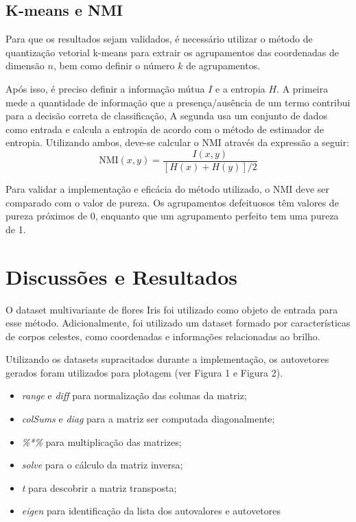 \documentclass{article}
\begin{document}
        \subsection{K-means e NMI}

            Para que os resultados sejam validados, é necessário utilizar o método de quantização vetorial k-means para extrair os agrupamentos das coordenadas de dimensão $n$, bem como definir o número $k$ de agrupamentos.

            Após isso, é preciso definir a informação mútua $I$ e a entropia $H$.
            A primeira mede a quantidade de informação que a presença/ausência de um termo contribui para a decisão correta de classificação,
            A segunda usa um conjunto de dados como entrada e calcula a entropia de acordo com o método de estimador de entropia.
            Utilizando ambos, deve-se calcular o NMI através da expressão a seguir:
            \[
                \text{NMI}(x,y)=\frac{I(x,y)}{[H(x)+H(y)]/2}
            \]

            Para validar a implementação e eficácia do método utilizado, o NMI deve ser comparado com o valor de pureza.
            Os agrupamentos defeituosos têm valores de pureza próximos de 0, enquanto que um agrupamento perfeito tem uma pureza de 1.

    \section{Discussões e Resultados}

        O dataset multivariante de flores Iris\cite{fisher1936use} foi utilizado como objeto de entrada para esse método.
        Adicionalmente, foi utilizado um dataset formado por características de corpos celestes, como coordenadas e informações relacionadas ao brilho.

        Utilizando os datasets supracitados durante a implementação, os autovetores gerados foram utilizados para plotagem (ver Figura 1 e Figura 2).

        \begin{itemize}
            \item\textit{range} e \textit{diff} para normalização das colunas da matriz;
            \item\textit{colSums} e \textit{diag} para a matriz ser computada diagonalmente;
            \item\textit{\%*\%} para multiplicação das matrizes;
            \item\textit{solve} para o cálculo da matriz inversa;
            \item\textit{t} para descobrir a matriz transposta;
            \item\textit{eigen} para identificação da lista dos autovalores e autovetores
        \end{itemize}
\end{document}
